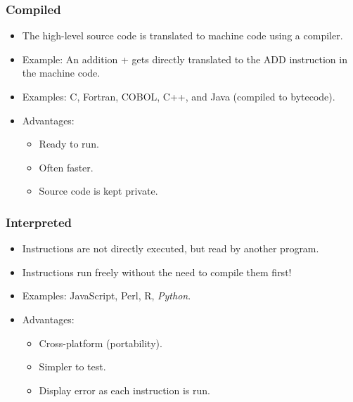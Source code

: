 \documentclass[11pt]{article}
\providecommand{\tightlist}{%
      \setlength{\itemsep}{0pt}\setlength{\parskip}{0pt}}
\begin{document}
    \hypertarget{compiled}{%
\subsubsection{Compiled}\label{compiled}}

\begin{itemize}
\tightlist
\item
  The high-level source code is translated to machine code using a
  compiler.
\item
  Example: An addition + gets directly translated to the ADD instruction
  in the machine code.
\item
  Examples: C, Fortran, COBOL, C++, and Java (compiled to bytecode).
\item
  Advantages:

  \begin{itemize}
  \tightlist
  \item
    Ready to run.
  \item
    Often faster.
  \item
    Source code is kept private.
  \end{itemize}
\end{itemize}

    \hypertarget{interpreted}{%
\subsubsection{Interpreted}\label{interpreted}}

\begin{itemize}
\tightlist
\item
  Instructions are not directly executed, but read by another program.
\item
  Instructions run freely without the need to compile them first!
\item
  Examples: JavaScript, Perl, R, \emph{Python}.
\item
  Advantages:

  \begin{itemize}
  \tightlist
  \item
    Cross-platform (portability).
  \item
    Simpler to test.
  \item
    Display error as each instruction is run.
  \end{itemize}
\end{itemize}
\end{document}
